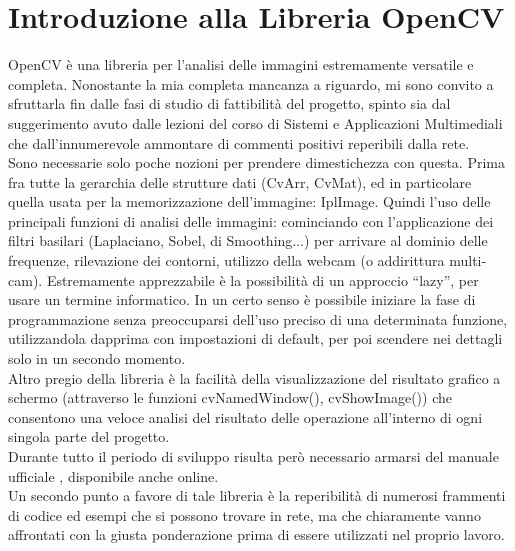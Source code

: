 \documentclass[a4paper,10pt, twocolumn]{article}
\begin{document}
\section{Introduzione alla Libreria OpenCV}
OpenCV \`{e} una libreria per l'analisi delle immagini estremamente versatile e completa.
Nonostante la mia completa mancanza a riguardo, mi sono convito a sfruttarla fin 
dalle fasi di studio di fattibilit\`{a} del progetto, 
spinto sia dal suggerimento avuto dalle lezioni del corso di 
Sistemi e Applicazioni Multimediali \cite{slide} che dall'innumerevole ammontare di 
commenti positivi reperibili dalla rete.\\
Sono necessarie solo poche nozioni per prendere dimestichezza con questa. 
Prima fra tutte la gerarchia delle strutture dati (CvArr, CvMat), ed 
in particolare quella usata per la memorizzazione dell'immagine:
IplImage. Quindi l'uso delle principali funzioni di analisi delle 
immagini: cominciando con l'applicazione dei filtri basilari (Laplaciano,
Sobel, di Smoothing...) per arrivare al dominio delle frequenze, 
rilevazione dei contorni, utilizzo della webcam (o addirittura multi-cam). 
Estremamente apprezzabile \`{e} la possibilit\`{a} di un
approccio ``lazy'', per usare un termine informatico. In un certo senso \`{e} possibile
iniziare la fase di programmazione senza preoccuparsi dell'uso preciso di una 
determinata funzione, utilizzandola dapprima con impostazioni di default,
per poi scendere nei dettagli solo in un secondo momento.\\
Altro pregio della libreria \`{e} la facilit\`{a} della visualizzazione del risultato
grafico a schermo (attraverso le funzioni cvNamedWindow(), cvShowImage()) che
consentono una veloce analisi del risultato delle operazione all'interno di
ogni singola parte del progetto.\\
Durante tutto il periodo di sviluppo risulta per\`{o} necessario armarsi del 
manuale ufficiale \cite{opencvReference}, disponibile anche online.\\
Un secondo punto a favore di tale libreria \`{e} la reperibilit\`{a} di numerosi 
frammenti di codice ed esempi che si possono trovare in rete, ma che chiaramente
vanno affrontati con la giusta ponderazione prima di essere utilizzati nel
proprio lavoro.
  
\end{document}
